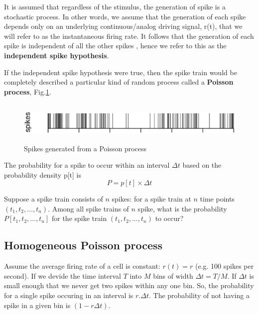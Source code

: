It is assumed that regardless of the stimulus, the generation of spike is a
stochastic process. In other words, we assume that the generation of each spike
depends only on an underlying continuous/analog driving signal, r(t), that we
will refer to as the instantaneous firing rate.
It follows that the generation of each spike is independent of all the other
spikes , hence we refer to this as the {\bf independent spike hypothesis}.

If the independent spike hypothesis were true, then the spike train would
be completely described a particular kind of random process called a {\bf
Poisson process}, Fig.\ref{fig:Poisson-process_cortex_spike}.


\begin{figure}[hbt]
  \centerline{\includegraphics[height=2cm,
    angle=0]{./images/Poisson-process_cortex_spike.eps}}
  \caption{Spikes generated from a Poisson process}
  \label{fig:Poisson-process_cortex_spike}
\end{figure}

The probability for a spike to occur within an interval $\Delta t$ based on the
probability density p[t] is
\begin{equation}
P = p[t] \times \Delta t
\end{equation}

Suppose a spike train consists of $n$ spikes: for a spike train at $n$ time
points $(t_1,t_2,\ldots,t_n)$.
Among all spike trains of $n$ spike, what is the probability
$P[t_1,t_2,\ldots,t_n]$ for the spike train $(t_1,t_2,\ldots,t_n)$ to occur?




\subsection{Homogeneous Poisson process}

Assume the average firing rate of a cell is constant: $r(t) = r$ (e.g. 100
spikes per second).
If we devide the time interval $T$ into $M$ bins of width $\Delta t = T/M$. If
$\Delta t$ is small enough that we never get two spikes within any one bin.
So, the probability for a single spike occuring in an interval is $r.\Delta t$.
The probability of not having a spike in a given bin is $(1-r\Delta t)$.

